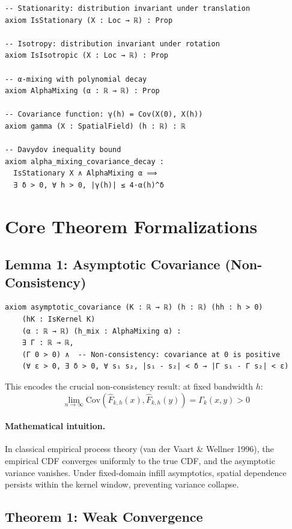 \documentclass[11pt,a4paper]{article}
\theoremstyle{definition}
\begin{document}
\begin{lstlisting}[caption={Random Field Properties}]
-- Stationarity: distribution invariant under translation
axiom IsStationary (X : Loc → ℝ) : Prop

-- Isotropy: distribution invariant under rotation
axiom IsIsotropic (X : Loc → ℝ) : Prop

-- α-mixing with polynomial decay
axiom AlphaMixing (α : ℝ → ℝ) : Prop

-- Covariance function: γ(h) = Cov(X(0), X(h))
axiom gamma (X : SpatialField) (h : ℝ) : ℝ

-- Davydov inequality bound
axiom alpha_mixing_covariance_decay :
  IsStationary X ∧ AlphaMixing α ⟹
  ∃ δ > 0, ∀ h > 0, |γ(h)| ≤ 4·α(h)^δ
\end{lstlisting}

\section{Core Theorem Formalizations}
\label{sec:theorems}

\subsection{Lemma 1: Asymptotic Covariance (Non-Consistency)}

\begin{lstlisting}[caption={Lemma 1: Asymptotic Covariance}]
axiom asymptotic_covariance (K : ℝ → ℝ) (h : ℝ) (hh : h > 0)
    (hK : IsKernel K)
    (α : ℝ → ℝ) (h_mix : AlphaMixing α) :
    ∃ Γ : ℝ → ℝ,
    (Γ 0 > 0) ∧  -- Non-consistency: covariance at 0 is positive
    (∀ ε > 0, ∃ δ > 0, ∀ s₁ s₂, |s₁ - s₂| < δ → |Γ s₁ - Γ s₂| < ε)
\end{lstlisting}

This encodes the crucial non-consistency result: at fixed bandwidth $h$:
\[
\lim_{n \to \infty} \text{Cov}(\hat{F}_{k,h}(x), \hat{F}_{k,h}(y)) = \Gamma_k(x,y) > 0
\]

\paragraph{Mathematical intuition.} In classical empirical process theory (van der Vaart \& Wellner 1996), the empirical CDF converges uniformly to the true CDF, and the asymptotic variance vanishes. Under fixed-domain infill asymptotics, spatial dependence persists within the kernel window, preventing variance collapse.

\subsection{Theorem 1: Weak Convergence}
\end{document}
